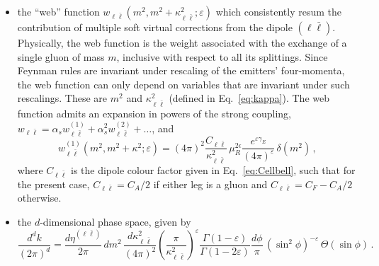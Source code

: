 \begin{itemize}
\item the ``web'' function
  $w_{\ell \bar \ell}(m^2,m^2+\kappa_{\ell\bar \ell}^2;\varepsilon)$
  which consistently resum the contribution of multiple soft virtual
  corrections from the dipole $(\ell\bar\ell)$. Physically, the web function is the weight associated
  with the exchange of a single gluon of mass $m$, inclusive with respect to
  all its splittings. Since Feynman rules are invariant under
  rescaling of the emitters' four-momenta, the web function can only
  depend on variables that are invariant under such rescalings. These
  are $m^2$ and $\kappa_{\ell\bar\ell}^2$ (defined in Eq.~\eqref{eq:kappa}).
  The web function admits an expansion in
  powers of the strong coupling,
  $w_{\ell \bar \ell} = \alpha_sw_{\ell \bar
    \ell}^{(1)}+\alpha_s^2w_{\ell \bar \ell}^{(2)}+\dots$, and
  \begin{equation}
    \label{eq:w1}
    w_{\ell \bar \ell}^{(1)}(m^2,m^2+\kappa^2;\varepsilon) = (4\pi)^2\frac{C_{\ell\bar\ell}}{\kappa_{\ell\bar\ell}^2}\,\mu_R^{2\epsilon}\frac{e^{\varepsilon\gamma_E}}{(4\pi)^{\varepsilon}}\,\delta(m^2)\,,
  \end{equation}
  where  $C_{\ell\bar \ell}$ is the dipole colour factor given in Eq.~\eqref{eq:Cellbell}, such that for the present case, $C_{\ell\bar \ell}=C_A/2$ if either leg is a gluon and $C_{\ell\bar \ell}=C_F-C_A/2$ otherwise.
\item the $d$-dimensional phase space, given by
  \begin{equation}
    \label{eq:dk}
    \frac{d^d k}{(2\pi)^d} = \frac{d\eta^{(\ell\bar \ell)}}{2\pi}\, dm^2 \,\frac{d\kappa^2_{\ell\bar \ell}}{(4\pi)^2}\left(\frac{\pi}{\kappa^2_{\ell\bar\ell}}\right)^\varepsilon\frac{\Gamma(1-\varepsilon)}{\Gamma(1-2\varepsilon)}\frac{d\phi}{\pi}\,(\sin^2\phi)^{-\varepsilon}\,\Theta(\sin\phi)\,. 
  \end{equation}
\end{itemize}

